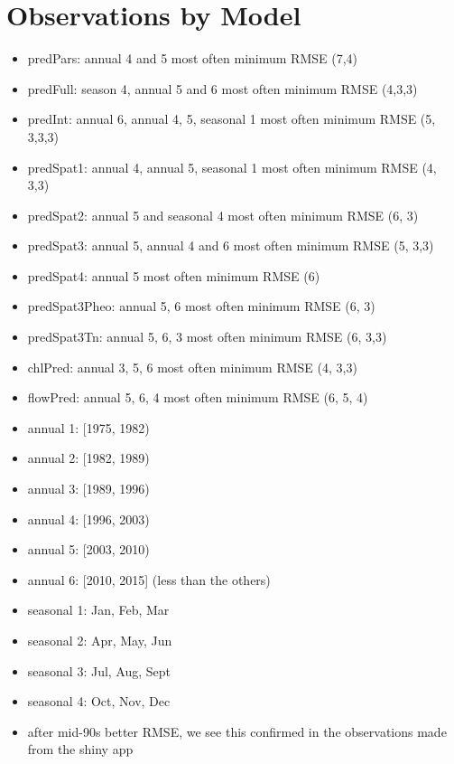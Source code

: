 \documentclass[12pt]{amsart}
\begin{document}
\section{Observations by Model}
\begin{itemize}
\item predPars: annual 4 and 5 most often minimum RMSE (7,4)
\item predFull: season 4, annual 5 and 6 most often minimum RMSE (4,3,3)
\item predInt: annual 6, annual 4, 5, seasonal 1 most often minimum RMSE (5, 3,3,3)
\item predSpat1: annual 4, annual 5, seasonal 1 most often minimum RMSE (4, 3,3)
\item predSpat2: annual 5 and seasonal 4 most often minimum RMSE (6, 3)
\item predSpat3: annual 5, annual 4 and 6 most often minimum RMSE (5, 3,3)
\item predSpat4: annual 5 most often minimum RMSE (6)
\item predSpat3Pheo: annual 5, 6 most often minimum RMSE (6, 3)
\item predSpat3Tn: annual 5, 6, 3 most often minimum RMSE (6, 3,3)
\item chlPred: annual 3, 5, 6 most often minimum RMSE (4, 3,3)
\item flowPred: annual 5, 6, 4 most often minimum RMSE (6, 5, 4)

\item annual 1: [1975, 1982)
\item annual 2: [1982, 1989)
\item annual 3: [1989, 1996)
\item annual 4: [1996, 2003)
\item annual 5: [2003, 2010)
\item annual 6: [2010, 2015] (less than the others)
\item seasonal 1: Jan, Feb, Mar
\item seasonal 2: Apr, May, Jun
\item seasonal 3: Jul, Aug, Sept
\item seasonal 4: Oct, Nov, Dec
\item after mid-90s better RMSE, we see this confirmed in the observations made from the shiny app
\end{itemize}
\end{document}
